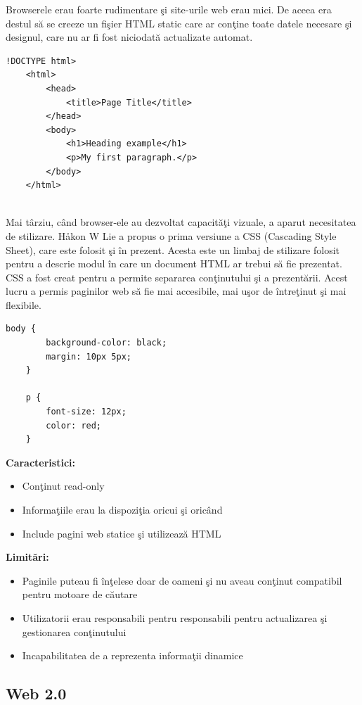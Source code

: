 \documentclass[12pt, a4paper]{report}
\begin{document}
Browserele erau foarte rudimentare \c si site-urile web erau mici. De aceea era destul s\u a se creeze un fi\c sier HTML static care ar con\c tine toate datele necesare \c si designul, care nu ar fi fost niciodat\u a actualizate automat.
\begin{lstlisting}[caption={Exemplu fi\c sier HTML},captionpos=b]
	!DOCTYPE html>
	<html>
		<head>
			<title>Page Title</title>
		</head>
		<body>
			<h1>Heading example</h1>
			<p>My first paragraph.</p>
		</body>
	</html>
	
\end{lstlisting}

Mai t\^ arziu, c\^ and browser-ele au dezvoltat capacit\u a\c ti vizuale, a aparut necesitatea de stilizare. Håkon W Lie a propus o prima versiune a CSS (Cascading Style Sheet), care este folosit \c si \^ in prezent. Acesta este un limbaj de stilizare folosit pentru a descrie modul \^ in care un document HTML ar trebui s\u a fie prezentat. CSS a fost creat pentru a permite separarea con\c tinutului \c si a prezent\u arii. Acest lucru a permis paginilor web s\u a fie mai accesibile, mai u\c sor de \^intre\c tinut \c si mai flexibile.
\begin{lstlisting}[caption={Exemplu fi\c sier CSS},captionpos=b]
	body {
		background-color: black;
		margin: 10px 5px;
	}

	p {
		font-size: 12px;
		color: red;
	}
\end{lstlisting}

\textbf{Caracteristici:}
\begin{itemize}
	\item Con\c tinut read-only
	\item Informa\c tiile erau la dispozi\c tia oricui \c si oric\^and
	\item Include pagini web statice \c si utilizeaz\u a HTML
\end{itemize}

\textbf{Limit\u ari:}
\begin{itemize}
	\item Paginile puteau fi \^in\c telese doar de oameni \c si nu aveau con\c tinut compatibil pentru motoare de c\u autare
	\item Utilizatorii erau responsabili pentru responsabili pentru actualizarea \c si gestionarea con\c tinutului
	\item Incapabilitatea de a reprezenta informa\c tii dinamice
\end{itemize}

\subsection{Web 2.0}
\end{document}
